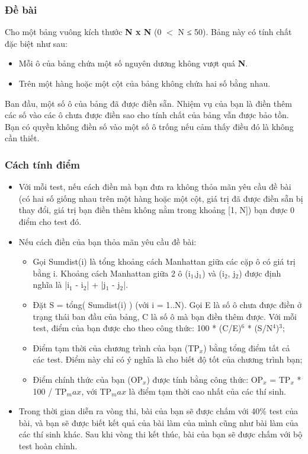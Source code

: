 

\subsubsection{Đề bài}

Cho một bảng vuông kích thước \textbf{N x N }(0 $<$ N ≤ 50). Bảng này có tính chất đặc biệt như sau:
\begin{itemize}
	\item Mỗi ô của bảng chứa một số nguyên dương không vượt quá \textbf{N}.
	\item Trên một hàng hoặc một cột của bảng không chứa hai số bằng nhau. 
\end{itemize}

Ban đầu, một số ô của bảng đã được điền sẵn. Nhiệm vụ của bạn là điền thêm các số vào các ô chưa được điền sao cho tính chất của bảng vẫn được bảo tồn. Bạn có quyền không điền số vào một số ô trống nếu cảm thấy điều đó là không cần thiết.

\subsubsection{Cách tính điểm}
\begin{itemize}
	\item Với mỗi test, nếu cách điền mà bạn đưa ra không thỏa mãn yêu cầu đề bài (có hai số giống nhau trên một hàng hoặc một cột, giá trị đã được điền sẵn bị thay đổi, giá trị bạn điền thêm không nằm trong khoảng [1, N]) bạn được 0 điểm cho test đó.
	\item Nếu cách điền của bạn thỏa mãn yêu cầu đề bài: 

\begin{itemize}
	\item Gọi Sumdist(i) là tổng khoảng cách Manhattan giữa các cặp ô có giá trị bằng i. Khoảng cách Manhattan giữa 2 ô (i$_1$,j$_1$) và (i$_2$, j$_2$) được định nghĩa là |i$_1$ - i$_2$| + |j$_1$ - j$_2$|. 
	\item Đặt S = tổng( Sumdist(i) ) (với i = 1..N). Gọi E là số ô chưa được điền ở trạng thái ban đầu của bảng, C là số ô mà bạn điền thêm được. Với mỗi test, điểm của bạn được cho theo công thức: 100 * (C/E)$^6$ * (S/N$^4$)$^3$;
	\item Điểm tạm thời của chương trình của bạn (TP$_x$) bằng tổng điểm tất cả các test. Điểm này chỉ có ý nghĩa là cho biết độ tốt của chương trình bạn; 
	\item Điểm chính thức của bạn (OP$_x$) được tính bằng công thức: OP$_x$ = TP$_x$ * 100 / TP$_max $, với TP$_max$ là điểm tạm thời cao nhất của các thí sinh. 
\end{itemize}
	\item Trong thời gian diễn ra vòng thi, bài của bạn sẽ được chấm với 40\% test của bài, và bạn sẽ được biết kết quả của bài làm của mình cũng như bài làm của các thí sinh khác. Sau khi vòng thi kết thúc, bài của bạn sẽ được chấm với bộ test hoàn chỉnh. 
\end{itemize}


